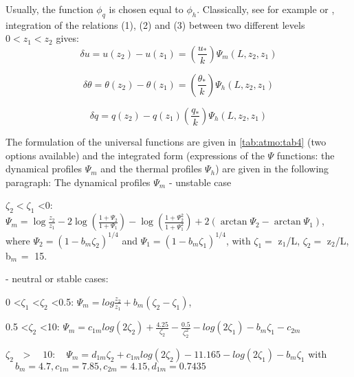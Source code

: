 Usually, the function $\phi_{q} $ is chosen equal to $\phi
_{h} $. Classically, see for example \cite{Garratt:1992} or \cite{Cheng:2005},
integration of the relations (1), (2) and (3)%
between two different levels $0<z_{1} <z_{2} $ gives:
\begin{equation}
\label{eq:atmo:eq9}
\delta u=u(z_2)-u(z_1)=
\left(\frac {u_{\ast}}{k} \right)\Psi_{m}\left({L,z_2,z_1} \right)
\end{equation}

\begin{equation}
\label{eq:atmo:eq10}
\delta \theta=\theta (z_2) -\theta (z_1)=
\left(\frac{\theta_{\ast}}{k} \right)\Psi_{h}\left({L,z_2,z_1} \right)
\end{equation}

\begin{equation}
\label{eq:atmo:eq11}
\delta q=q(z_2)-q(z_1)
\left( {\frac{q_{\ast}}{k}} \right)\Psi_{h} \left({L,z_2,z_1} \right)
\end{equation}

The formulation of the universal functions are given in \tablename{} \ref{tab:atmo:tab4} (two
options available) and the integrated form (expressions of the $\Psi$ functions:
the dynamical profiles $\Psi_{m}$ and the thermal profiles $\Psi_{h}$) are given in the following paragraph:
\newline
The dynamical profiles $\Psi_{m}$
\newline
- unstable case

$\zeta_{2}< \zeta_{1}$ \textless 0:
$\Psi_{m} =\log \frac{z_{2}}{z_{1}}-2\log \left({\frac{1+\Psi_{2} }{1+\Psi_{1} }}\right)-\log
\left( {\frac{1+\Psi_{2}^{2} }{1+\Psi_{1}^{2} }} \right)+2\left( {\arctan
\Psi_{2} -\arctan \Psi_{1} } \right)$,
\newline
where $\Psi_{2}= (1-b_{m} \zeta_{2})^{1/4}$ and $\Psi_{1} =(1-b_{m} \zeta_{1})^{1/4}$,
\newline
with $\zeta_{1}= $ z$_{1}$/L, $\zeta_{2}= $ z$_{2}$/L, b$_{m\, }= $ 15.

- neutral or stable cases:

0 \textless $\zeta_{1}$ \textless $\zeta_{2}$ \textless 0.5:
$\Psi_{m} =log\frac{z_{2} }{z_{1} }+b_{m} \left( {\zeta_{2} -\zeta_{1} } \right)$,

0.5 \textless $\zeta_{2}$ \textless 10:
$\Psi_{m} =c_{1m} log(2\zeta_{2})+\frac{4.25}{\zeta_{2}}-\frac{0.5}{\zeta_{2}^{2}}-log(2\zeta_{1} )-b_{m} \zeta_{1} -c_{2m} $

$\zeta_{2\quad }>\quad 10:
\quad
\Psi_{m} =d_{1m} \zeta_{2}
+c_{1m} log\left( {2\zeta_{2} }
\right)-\mbox{11.165}-log(2\zeta_{1}
)-b_{m} \zeta_{1}
$
\newline
with $\quad b_{m} = 4.7, c_{1m} = 7.85, c_{2m} = 4.15, d_{1m} = 0.7435$

